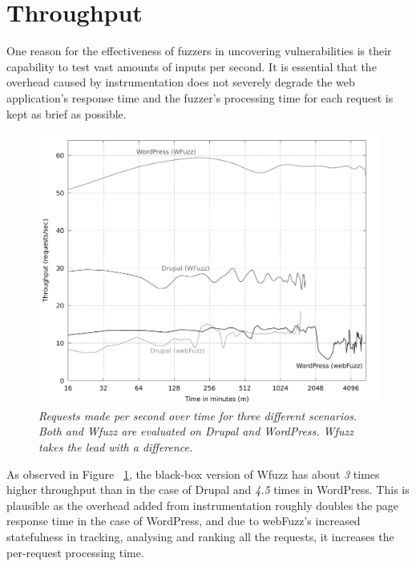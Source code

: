 \section{Throughput}
One reason for the effectiveness of fuzzers in uncovering vulnerabilities is their capability to test vast amounts of inputs per second. It is essential that the overhead caused by instrumentation does not severely degrade the web application's response time and the fuzzer's processing time for each request is kept as brief as possible.

\begin{figure}[!htb]
  \centering \includegraphics[width=\linewidth]{figures/plot_throughput.pdf}
  \captionsetup{justification=centering}  
  \caption[Throughput of \pname{} and Wfuzz when fuzzing Drupal and WordPress]{\textit{Requests made per second over time for three different scenarios. Both \pname{} and Wfuzz are evaluated on Drupal and WordPress. Wfuzz takes the lead with a difference.}} 
  \label{fig:plot_throughput}
\end{figure}

As observed in Figure ~\ref{fig:plot_throughput}, the black-box version of Wfuzz has about \emph{3} times higher throughput than \pname{} in the case of Drupal and \emph{4.5} times in WordPress. This is plausible as the overhead added from instrumentation roughly doubles the page response time in the case of WordPress, and due to webFuzz's increased statefulness in tracking, analysing and ranking all the requests, it increases the per-request processing time.


